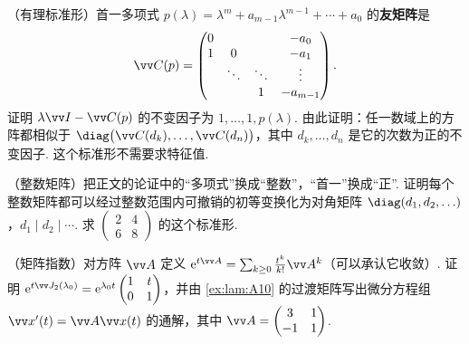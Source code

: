 {		\Cgroup
		\begin{exC}
			\item\label{ex:lam:C1} （有理标准形）首一多项式 $p(\lambda)=\lambda^m+a_{m-1}\lambda^{m-1}+\cdots+a_0$ 的\textbf{友矩阵}是
			\[\vv C(p)=\begin{pmatrix}0&&&-a_0\\1&0&&-a_1\\&\ddots&\ddots&\vdots\\&&1&-a_{m-1}\end{pmatrix}.\]
			证明 $\lambda\vv I-\vv C(p)$ 的不变因子为 $1,\ldots,1,p(\lambda)$. 由此证明：任一数域上的方阵都相似于 $\diag\big(\vv C(d_{k}),\ldots,\vv C(d_n)\big)$，其中 $d_k,\ldots,d_n$ 是它的次数为正的不变因子. 这个标准形不需要求特征值.
			\item\label{ex:lam:C2} （整数矩阵）把正文的论证中的“多项式”换成“整数”，“首一”换成“正”. 证明每个整数矩阵都可以经过整数范围内可撤销的初等变换化为对角矩阵 $\diag(d_1,d_2,\ldots)$，$d_1\mid d_2\mid\cdots$. 求 $\begin{pmatrix}2&4\\6&8\end{pmatrix}$ 的这个标准形.
			\item\label{ex:lam:C3} （矩阵指数）对方阵 $\vv A$ 定义 $\mathrm e^{t\vv A}=\sum_{k\ge0}\frac{t^k}{k!}\vv A^k$（可以承认它收敛）. 证明 $\mathrm e^{t\vv J_2(\lambda_0)}=\mathrm e^{\lambda_0t}\begin{pmatrix}1&t\\0&1\end{pmatrix}$，并由 \ref{ex:lam:A10} 的过渡矩阵写出微分方程组 $\vv x'(t)=\vv A\vv x(t)$ 的通解，其中 $\vv A=\begin{pmatrix}3&1\\-1&1\end{pmatrix}$.
		\end{exC}
	}
	
